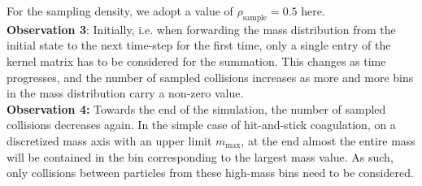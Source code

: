         For the sampling density, we adopt a value of $\rho_\text{sample} = 0.5$ here. \\

        \textbf{Observation 3}: Initially, i.e. when forwarding the mass distribution from 
        the initial state to the next time-step for the first time, only a single entry of 
        the kernel matrix has to be considered for the summation. This changes as time 
        progresses, and the number of sampled collisions increases as more and more bins 
        in the mass distribution carry a non-zero value. \\

        \textbf{Observation 4:} Towards the end of the simulation, the number of sampled 
        collisions decreases again. In the simple case of hit-and-stick coagulation, on a 
        discretized mass axis with an upper limit $m_\text{max}$, at the end almost the 
        entire mass will be contained in the bin corresponding to the largest mass value. 
        As such, only collisions between particles from these high-mass bins need to be 
        considered.

